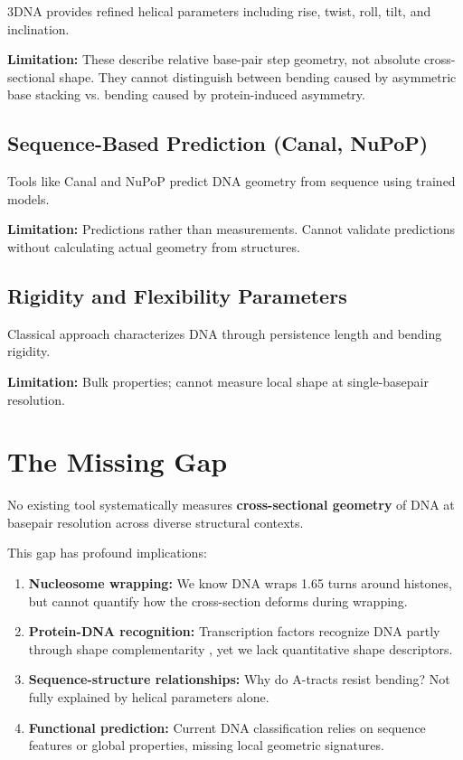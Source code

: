 3DNA \citep{Lu2003} provides refined helical parameters including rise, twist, roll, tilt, and inclination.

\textbf{Limitation:} These describe relative base-pair step geometry, not absolute cross-sectional shape. They cannot distinguish between bending caused by asymmetric base stacking vs. bending caused by protein-induced asymmetry.

\subsection{Sequence-Based Prediction (Canal, NuPoP)}

Tools like Canal \citep{Vlahovicek2003} and NuPoP \citep{Xi2010} predict DNA geometry from sequence using trained models.

\textbf{Limitation:} Predictions rather than measurements. Cannot validate predictions without calculating actual geometry from structures.

\subsection{Rigidity and Flexibility Parameters}

Classical approach characterizes DNA through persistence length and bending rigidity.

\textbf{Limitation:} Bulk properties; cannot measure local shape at single-basepair resolution.

\section{The Missing Gap}

\begin{highlight}
    No existing tool systematically measures \textbf{cross-sectional geometry} of DNA at basepair resolution across diverse structural contexts.
\end{highlight}

This gap has profound implications:

\begin{enumerate}
    \item \textbf{Nucleosome wrapping:} We know DNA wraps 1.65 turns around histones, but cannot quantify how the cross-section deforms during wrapping.
    
    \item \textbf{Protein-DNA recognition:} Transcription factors recognize DNA partly through shape complementarity \citep{Rohs2010}, yet we lack quantitative shape descriptors.
    
    \item \textbf{Sequence-structure relationships:} Why do A-tracts resist bending? Not fully explained by helical parameters alone.
    
    \item \textbf{Functional prediction:} Current DNA classification relies on sequence features or global properties, missing local geometric signatures.
\end{enumerate}

